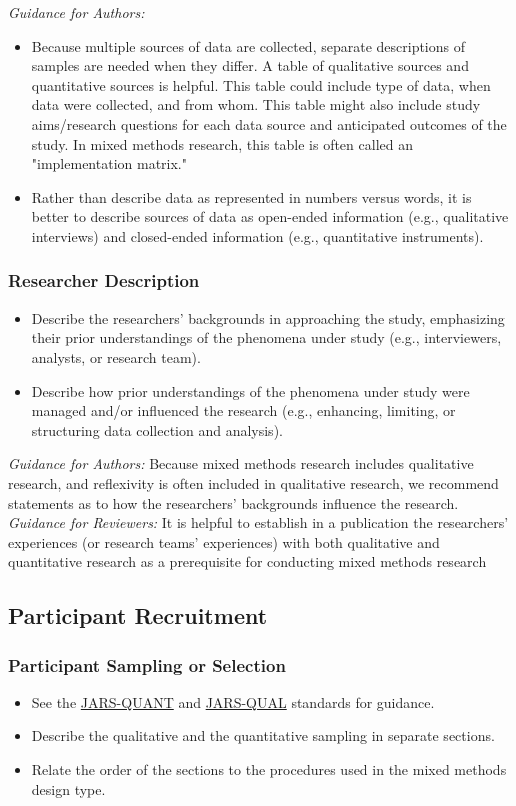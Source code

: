\documentclass[acmsmall,screen,anonymous,review]{acmart}
\begin{document}
\textit{Guidance for Authors:}
\begin{itemize}
\item Because multiple sources of data are collected, separate descriptions of samples are needed when they differ. A table of qualitative sources and quantitative sources is helpful. This table could include type of data, when data were collected, and from whom. This table might also include study aims/research questions for each data source and anticipated outcomes of the study. In mixed methods research, this table is often called an "implementation matrix." 
\item Rather than describe data as represented in numbers versus words, it is better to describe sources of data as open-ended information (e.g., qualitative interviews) and closed-ended information (e.g., quantitative instruments).
\end{itemize}

\subsubsection{Researcher Description}
\begin{itemize}
\item Describe the researchers’ backgrounds in approaching the study, emphasizing their prior understandings of the phenomena under study (e.g., interviewers, analysts, or research team). 
\item Describe how prior understandings of the phenomena under study were managed and/or influenced the research (e.g., enhancing, limiting, or structuring data collection and analysis). 
\end{itemize}

\textit{Guidance for Authors: }
Because mixed methods research includes qualitative research, and reflexivity is often included in qualitative research, we recommend statements as to how the researchers’ backgrounds influence the research. 
\textit{Guidance for Reviewers:}
It is helpful to establish in a publication the researchers’ experiences (or research teams’ experiences) with both qualitative and quantitative research as a prerequisite for conducting mixed methods research




\subsection{Participant Recruitment}

\subsubsection{Participant Sampling or Selection}
\begin{itemize}
\item See the \href{https://apastyle.apa.org/jars/quantitative}{JARS-QUANT} and \href{https://apastyle.apa.org/jars/qualitative}{JARS-QUAL} standards for guidance.
\item Describe the qualitative and the quantitative sampling in separate sections. 
\item Relate the order of the sections to the procedures used in the mixed methods design type.
\end{itemize}
\end{document}
